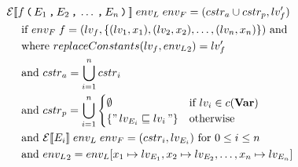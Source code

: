 \begin{align*}
& \mathcal{E}[\![ f \, \texttt{(} \, E_1 \, \texttt{,} \, E_2 \, \texttt{,} \, \dots \, \texttt{,} \, E_n \, \texttt{)} \, ]\!] \; {env_L} \; {env_F} = (cstr_a \cup cstr_p, lv_f') \\
& \quad \text{ if } {env_F} \; f = (lv_f, \{(lv_1, x_1), (lv_2, x_2), \dots, (lv_n, x_n)\}) \text{ and} \\
& \quad \text{ where } replaceConstants(lv_f, {env_L}_2) = lv_f' \\
& \quad \text{ and } {cstr}_a = \bigcup\limits_{i=1}^n {cstr}_i \\
& \quad \text{ and } {cstr}_p = \bigcup\limits_{i=1}^n
  \begin{cases}
    \emptyset &\text{if } lv_i \in c(\mathbf{Var})\\
    \{ "\,lv_{E_i} \sqsubseteq lv_i\," \} & \text{otherwise}
  \end{cases} \\
& \quad \text{ and } \mathcal{E}[\![ E_i ]\!] \; {env_L} \; {env_F} = (cstr_i, lv_{E_i}) \text{ for } 0 \leq i \leq n \\
& \quad \text{ and } {env_L}_2 = {env_L}[x_1 \mapsto lv_{E_1}, x_2 \mapsto lv_{E_2}, \dots, x_n \mapsto lv_{E_n}]
\end{align*}
